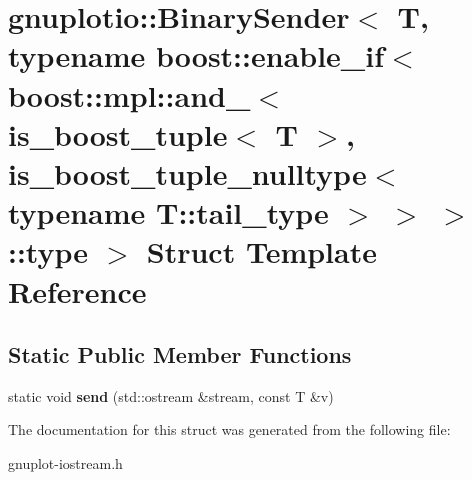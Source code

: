 \hypertarget{structgnuplotio_1_1BinarySender_3_01T_00_01typename_01boost_1_1enable__if_3_01boost_1_1mpl_1_1anbc7c19c30874558f14f1e5020da805a3}{}\section{gnuplotio\+:\+:Binary\+Sender$<$ T, typename boost\+:\+:enable\+\_\+if$<$ boost\+:\+:mpl\+:\+:and\+\_\+$<$ is\+\_\+boost\+\_\+tuple$<$ T $>$, is\+\_\+boost\+\_\+tuple\+\_\+nulltype$<$ typename T\+:\+:tail\+\_\+type $>$ $>$ $>$\+:\+:type $>$ Struct Template Reference}
\label{structgnuplotio_1_1BinarySender_3_01T_00_01typename_01boost_1_1enable__if_3_01boost_1_1mpl_1_1anbc7c19c30874558f14f1e5020da805a3}
\subsection*{Static Public Member Functions}
\begin{DoxyCompactItemize}
\item 
\mbox{\label{structgnuplotio_1_1BinarySender_3_01T_00_01typename_01boost_1_1enable__if_3_01boost_1_1mpl_1_1anbc7c19c30874558f14f1e5020da805a3_a50e54b7f2aba37f1f9e63fa81941b6d6}} 
static void {\bfseries send} (std\+::ostream \&stream, const T \&v)
\end{DoxyCompactItemize}


The documentation for this struct was generated from the following file\+:\begin{DoxyCompactItemize}
\item 
gnuplot-\/iostream.\+h\end{DoxyCompactItemize}
